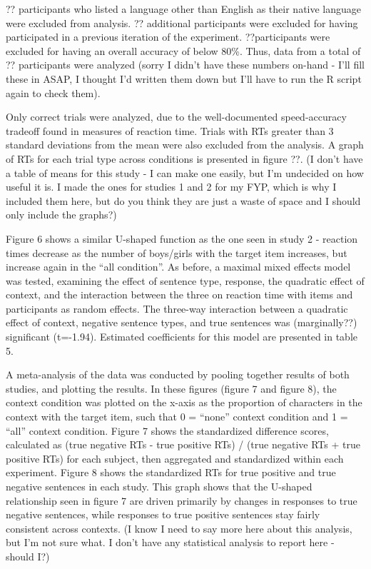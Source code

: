 \documentclass[10pt,letterpaper]{article}
\begin{document}
?? participants who listed a language other than English as their native language were excluded from analysis.  ?? additional participants were excluded for having participated in a previous iteration of the experiment.  ??participants were excluded for having an overall accuracy of below 80\%.  Thus, data from a total of ?? participants were analyzed (sorry I didn't have these numbers on-hand - I'll fill these in ASAP, I thought I'd written them down but I'll have to run the R script again to check them).  

Only correct trials were analyzed, due to the well-documented speed-accuracy tradeoff found in measures of reaction time.  Trials with RTs greater than 3 standard deviations from the mean were also excluded from the analysis. A graph of RTs for each trial type across conditions is presented in figure ??.   (I don't have a table of means for this study - I can make one easily, but I'm undecided on how useful it is.  I made the ones for studies 1 and 2 for my FYP, which is why I included them here, but do you think they are just a waste of space and I should only include the graphs?)

Figure 6 shows a similar U-shaped function as the one seen in study 2 - reaction times decrease as the number of boys/girls with the target item increases, but increase again in the ``all condition''.  As before, a maximal mixed effects model was tested, examining the effect of sentence type, response, the quadratic effect of context, and the interaction between the three on reaction time with items and participants as random effects.  The three-way interaction between a quadratic effect of context, negative sentence types, and true sentences was (marginally??) significant (t=-1.94).  Estimated coefficients for this model are presented in table 5.  

A meta-analysis of the data was conducted by pooling together results of both studies, and plotting the results.  In these figures (figure 7 and figure 8), the context condition was plotted on the x-axis as the proportion of characters in the context with the target item, such that 0 = ``none'' context condition and 1 = ``all'' context condition.  Figure 7 shows the standardized difference scores, calculated as (true negative RTs - true positive RTs) / (true negative RTs + true positive RTs) for each subject, then aggregated and standardized within each experiment.  Figure 8 shows the standardized RTs for true positive and true negative sentences in each study.  This graph shows that the U-shaped relationship seen in figure 7 are driven primarily by changes in responses to true negative sentences, while responses to true positive sentences stay fairly consistent across contexts.  (I know I need to say more here about this analysis, but I'm not sure what.  I don't have any statistical analysis to report here - should I?)
\end{document}
